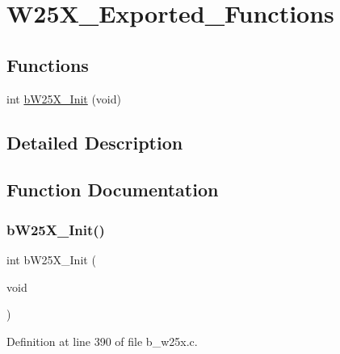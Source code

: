 \hypertarget{group___w25_x___exported___functions}{}\section{W25\+X\+\_\+\+Exported\+\_\+\+Functions}
\label{group___w25_x___exported___functions}
\subsection*{Functions}
\begin{DoxyCompactItemize}
\item 
int \mbox{\hyperlink{group___w25_x___exported___functions_gaf21a484dde17ecbe3be7b7ce034325e7}{b\+W25\+X\+\_\+\+Init}} (void)
\end{DoxyCompactItemize}


\subsection{Detailed Description}


\subsection{Function Documentation}
\mbox{\label{group___w25_x___exported___functions_gaf21a484dde17ecbe3be7b7ce034325e7}} 
\subsubsection{\texorpdfstring{b\+W25\+X\+\_\+\+Init()}{bW25X\_Init()}}
{\footnotesize\ttfamily int b\+W25\+X\+\_\+\+Init (\begin{DoxyParamCaption}\item[{void}]{ }\end{DoxyParamCaption})}



Definition at line 390 of file b\+\_\+w25x.\+c.

